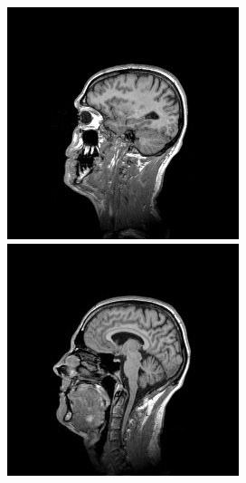 \begin{figure}[ht]
\begin{minipage}[c]{0.19\linewidth}
        \end{minipage}
        \begin{minipage}[c]{0.19\linewidth}
            \centering
            \includegraphics[width=\textwidth]{Files/report_images/sagittal_example4.jpg}
        \end{minipage}
        \begin{minipage}[c]{0.19\linewidth}
            \centering
            \includegraphics[width=\textwidth]{Files/report_images/sagittal_example5.jpg}

\end{minipage}
\end{figure}
